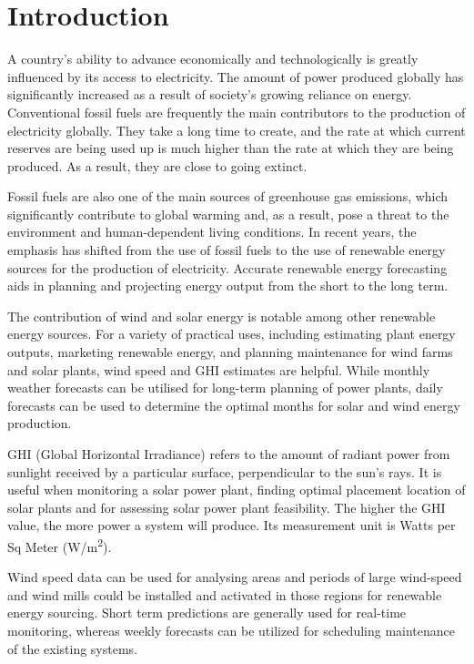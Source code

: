 \documentclass[a4paper,12pt]{article}
\begin{document}
\section{Introduction}
\label{sec:orgadedeb2}
A country's ability to advance economically and technologically is greatly influenced by its access to electricity. The amount of power produced globally has significantly increased as a result of society's growing reliance on energy. Conventional fossil fuels are frequently the main contributors to the production of electricity globally. They take a long time to create, and the rate at which current reserves are being used up is much higher than the rate at which they are being produced. As a result, they are close to going extinct.

Fossil fuels are also one of the main sources of greenhouse gas emissions, which significantly contribute to global warming and, as a result, pose a threat to the environment and human-dependent living conditions. In recent years, the emphasis has shifted from the use of fossil fuels to the use of renewable energy sources for the production of electricity. Accurate renewable energy forecasting aids in planning and projecting energy output from the short to the long term.

The contribution of wind and solar energy is notable among other renewable energy sources. For a variety of practical uses, including estimating plant energy outputs, marketing renewable energy, and planning maintenance for wind farms and solar plants, wind speed and GHI estimates are helpful. While monthly weather forecasts can be utilised for long-term planning of power plants, daily forecasts can be used to determine the optimal months for solar and wind energy production.

GHI (Global Horizontal Irradiance) refers to the amount of radiant power from sunlight received by a particular surface, perpendicular to the sun’s rays. It is useful when monitoring a solar power plant, finding optimal placement location of solar plants and for assessing solar power plant feasibility. The higher the GHI value, the more power a system will produce. Its measurement unit is Watts per Sq Meter (W/m\textsuperscript{2}).

Wind speed data can be used for analysing areas and periods of large wind-speed and wind mills could be installed and activated in those regions for renewable energy sourcing. Short term predictions are generally used for real-time monitoring, whereas weekly forecasts can be utilized for scheduling maintenance of the existing systems.
\end{document}
